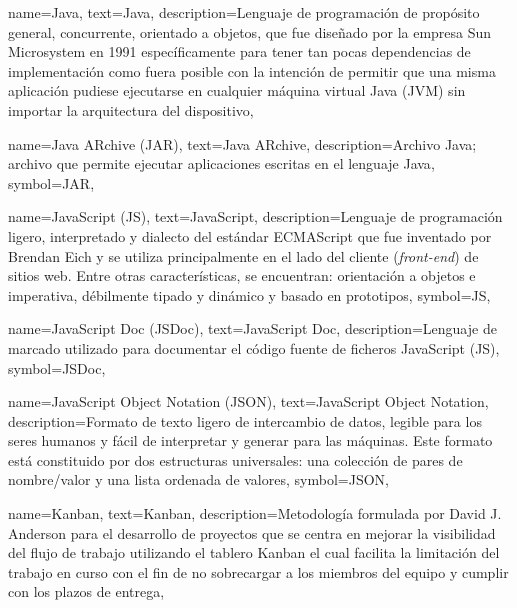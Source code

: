 {
    name={Java},
    text={Java},
    description={Lenguaje de programación de propósito general, concurrente, orientado a objetos, que fue diseñado por la empresa Sun Microsystem en 1991 específicamente para tener tan pocas dependencias de implementación como fuera posible con la intención de permitir que una misma aplicación pudiese ejecutarse en cualquier máquina virtual Java (JVM) sin importar la arquitectura del dispositivo},
}

{
    name={Java ARchive (JAR)},
    text={Java ARchive},
    description={Archivo Java; archivo que permite ejecutar aplicaciones escritas en el lenguaje Java},
	symbol={JAR},
}

{
    name={JavaScript (JS)},
    text={JavaScript},
    description={Lenguaje de programación ligero, interpretado y dialecto del estándar ECMAScript que fue inventado por Brendan Eich y se utiliza principalmente en el lado del cliente (\textit{front-end}) de sitios web. Entre otras características, se encuentran: orientación a objetos e imperativa, débilmente tipado y dinámico y basado en prototipos},
	symbol={JS},
}

{
    name={JavaScript Doc (JSDoc)},
    text={JavaScript Doc},
    description={Lenguaje de marcado utilizado para documentar el código fuente de ficheros JavaScript (JS)},
    symbol={JSDoc},
}

{
    name={JavaScript Object Notation (JSON)},
    text={JavaScript Object Notation},
    description={Formato de texto ligero de intercambio de datos, legible para los seres humanos y fácil de interpretar y generar para las máquinas. Este formato está constituido por dos estructuras universales: una colección de pares de nombre/valor y una lista ordenada de valores},
    symbol={JSON},
}

{
    name={Kanban},
    text={Kanban},
    description={Metodología formulada por David J. Anderson para el desarrollo de proyectos que se centra en mejorar la visibilidad del flujo de trabajo utilizando el tablero Kanban el cual facilita la limitación del trabajo en curso con el fin de no sobrecargar a los miembros del equipo y cumplir con los plazos de entrega},
}

